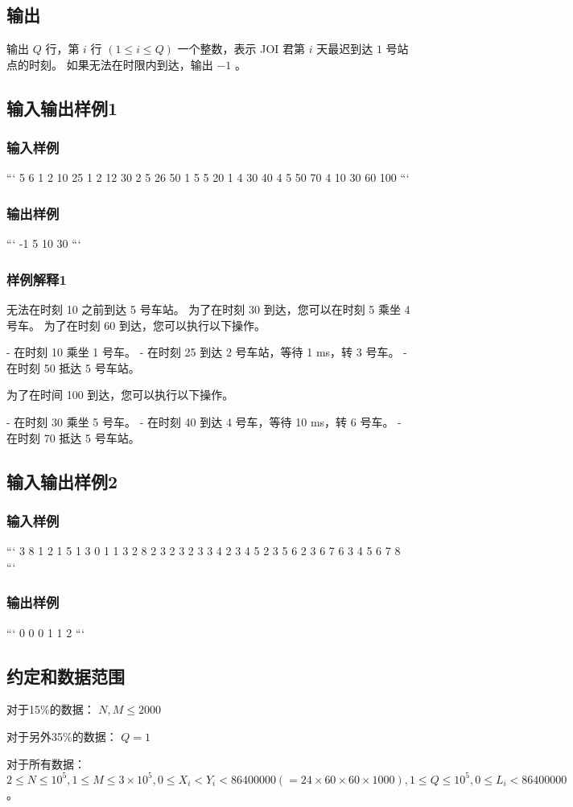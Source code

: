 \documentclass[UTF8]{ctexart}
\begin{document}
\subsection{输出}

输出 $Q$ 行，第 $i$ 行 $(1\le i\le Q)$ 一个整数，表示 JOI 君第 $i$ 天最迟到达 $1$ 号站点的时刻。 如果无法在时限内到达，输出 $-1$ 。

\subsection{输入输出样例1}


\subsubsection{输入样例}

```
5 6
1 2 10 25
1 2 12 30
2 5 26 50
1 5 5 20
1 4 30 40
4 5 50 70
4
10
30
60
100
```

\subsubsection{输出样例}

```
-1
5
10
30
```

\subsubsection{样例解释1}

无法在时刻 10 之前到达 5 号车站。 为了在时刻 30 到达，您可以在时刻 5 乘坐 4 号车。 为了在时刻 60 到达，您可以执行以下操作。

- 在时刻 10 乘坐 1 号车。
- 在时刻 25 到达 2 号车站，等待 1 ms，转 3 号车。
- 在时刻 50 抵达 5 号车站。

为了在时间 100 到达，您可以执行以下操作。

- 在时刻 30 乘坐 5 号车。
- 在时刻 40 到达 4 号车，等待 10 ms，转 6 号车。
- 在时刻 70 抵达 5 号车站。

\subsection{输入输出样例2}
\subsubsection{输入样例}

```
3 8
1 2 1 5
1 3 0 1
1 3 2 8
2 3 2 3
2 3 3 4
2 3 4 5
2 3 5 6
2 3 6 7
6
3
4
5
6
7
8
```

\subsubsection{输出样例}

```
0
0
0
1
1
2
```

\subsection{约定和数据范围}

对于15\%的数据： $N,M\le 2000$

对于另外35\%的数据： $Q=1$

对于所有数据： $2\le N\le 10^5,1\le M\le 3\times 10^5,0\le X_i<Y_i<86400000(=24\times 60\times 60\times 1000),1\le Q\le 10^5,0\le L_i<86400000$。
\end{document}

